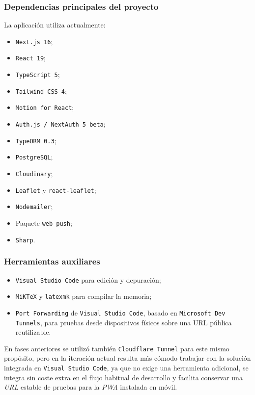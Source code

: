 \subsubsection*{Dependencias principales del proyecto}

La aplicación utiliza actualmente:

\begin{itemize}
    \item \texttt{Next.js 16};
    \item \texttt{React 19};
    \item \texttt{TypeScript 5};
    \item \texttt{Tailwind CSS 4};
    \item \texttt{Motion for React};
    \item \texttt{Auth.js / NextAuth 5 beta};
    \item \texttt{TypeORM 0.3};
    \item \texttt{PostgreSQL};
    \item \texttt{Cloudinary};
    \item \texttt{Leaflet} y \texttt{react-leaflet};
    \item \texttt{Nodemailer};
    \item Paquete \texttt{web-push};
    \item \texttt{Sharp}.
\end{itemize}

\subsubsection*{Herramientas auxiliares}

\begin{itemize}
    \item \texttt{Visual Studio Code} para edición y depuración;
    \item \texttt{MiKTeX} y \texttt{latexmk} para compilar la memoria;
    \item \texttt{Port Forwarding} de \texttt{Visual Studio Code}, basado en \texttt{Microsoft Dev Tunnels}, para pruebas desde dispositivos físicos sobre una URL pública reutilizable.
\end{itemize}

En fases anteriores se utilizó también \texttt{Cloudflare Tunnel} para este mismo propósito, pero en la iteración actual resulta más cómodo trabajar con la solución integrada en \texttt{Visual Studio Code}, ya que no exige una herramienta adicional, se integra sin coste extra en el flujo habitual de desarrollo y facilita conservar una \textit{URL} estable de pruebas para la \textit{PWA} instalada en móvil.

